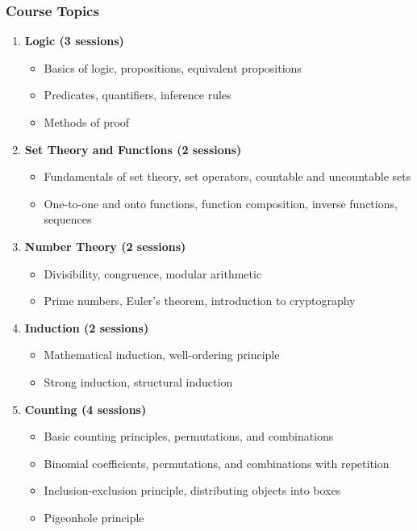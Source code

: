 \documentclass[12pt]{article}
\begin{document}
\subsubsection*{Course Topics}
\begin{enumerate}
    \item \textbf{Logic (3 sessions)} 
    \begin{itemize}
        \item Basics of logic, propositions, equivalent propositions
        \item Predicates, quantifiers, inference rules
        \item Methods of proof
    \end{itemize}
    \item \textbf{Set Theory and Functions (2 sessions)}
    \begin{itemize}
        \item Fundamentals of set theory, set operators, countable and uncountable sets
        \item One-to-one and onto functions, function composition, inverse functions, sequences
    \end{itemize}
    \item \textbf{Number Theory (2 sessions)}
    \begin{itemize}
        \item Divisibility, congruence, modular arithmetic
        \item Prime numbers, Euler's theorem, introduction to cryptography
    \end{itemize}
    \item \textbf{Induction (2 sessions)}
    \begin{itemize}
        \item Mathematical induction, well-ordering principle
        \item Strong induction, structural induction
    \end{itemize}
    \item \textbf{Counting (4 sessions)}
    \begin{itemize}
        \item Basic counting principles, permutations, and combinations
        \item Binomial coefficients, permutations, and combinations with repetition
        \item Inclusion-exclusion principle, distributing objects into boxes
        \item Pigeonhole principle
    \end{itemize}

\end{enumerate}
\end{document}
